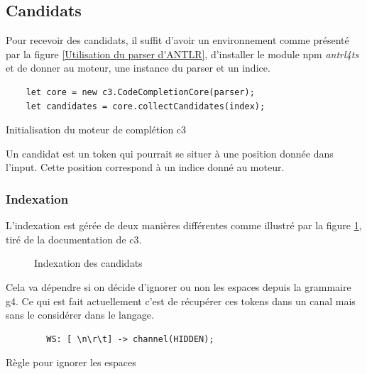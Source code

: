 \documentclass[
    iict, %
    il, %
]{heig-tb}
\begin{document}
\subsection{Candidats}\label{candidates}

Pour recevoir des candidats, il suffit d'avoir un environnement comme présenté par la figure \ref{Utilisation du parser d'ANTLR}, d'installer le module npm \emph{antrl4ts} et
de donner au moteur, une instance du parser et un indice.

\begin{listing}[!ht]
    \begin{verbatim}
    let core = new c3.CodeCompletionCore(parser);
    let candidates = core.collectCandidates(index);
    \end{verbatim}
    \caption{Initialisation du moteur de complétion c3}
    \label{c3-setup}
\end{listing}

Un candidat est un token qui pourrait se situer à une position donnée dans l'input.
Cette position correspond à un indice donné au moteur.

\subsubsection{Indexation}
L'indexation est gérée de deux manières différentes comme illustré par la figure \ref{candidat-index}, tiré de la documentation de c3.

\begin{figure}[!h]
    \begin{center}
    \end{center}
    \caption[Indexation des candidats]{\label{candidat-index} Indexation des candidats}
\end{figure}

Cela va dépendre si on décide d'ignorer ou non les espaces depuis la grammaire g4.
Ce qui est fait actuellement c'est de récupérer ces tokens dans un canal mais sans le considérer dans le langage.

\begin{listing}[H]
    \begin{verbatim}
        WS: [ \n\r\t] -> channel(HIDDEN);
    \end{verbatim}
    \caption{Règle pour ignorer les espaces}
    \label{space-rule}
\end{listing}
\end{document}
